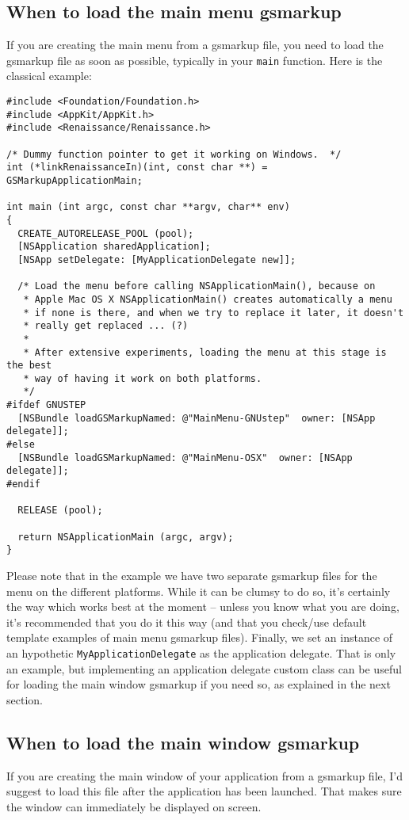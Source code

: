 \subsection{When to load the main menu gsmarkup}\label{integrating-renaissance-menu}
If you are creating the main menu from a gsmarkup file, you need to
load the gsmarkup file as soon as possible, typically in your
\texttt{main} function.  Here is the classical example:
\begin{verbatim}
#include <Foundation/Foundation.h>
#include <AppKit/AppKit.h>
#include <Renaissance/Renaissance.h>

/* Dummy function pointer to get it working on Windows.  */
int (*linkRenaissanceIn)(int, const char **) = GSMarkupApplicationMain;

int main (int argc, const char **argv, char** env)
{
  CREATE_AUTORELEASE_POOL (pool);
  [NSApplication sharedApplication];
  [NSApp setDelegate: [MyApplicationDelegate new]];

  /* Load the menu before calling NSApplicationMain(), because on
   * Apple Mac OS X NSApplicationMain() creates automatically a menu
   * if none is there, and when we try to replace it later, it doesn't
   * really get replaced ... (?)
   *
   * After extensive experiments, loading the menu at this stage is the best
   * way of having it work on both platforms.
   */
#ifdef GNUSTEP
  [NSBundle loadGSMarkupNamed: @"MainMenu-GNUstep"  owner: [NSApp delegate]];
#else
  [NSBundle loadGSMarkupNamed: @"MainMenu-OSX"  owner: [NSApp delegate]];
#endif

  RELEASE (pool);

  return NSApplicationMain (argc, argv);
}
\end{verbatim}
Please note that in the example we have two separate gsmarkup files
for the menu on the different platforms.  While it can be clumsy to do
so, it's certainly the way which works best at the moment -- unless
you know what you are doing, it's recommended that you do it this way
(and that you check/use default template examples of main menu
gsmarkup files).  Finally, we set an instance of an hypothetic
\texttt{MyApplicationDelegate} as the application delegate.  
That is only an example, but implementing an application delegate
custom class can be useful for loading the main window gsmarkup if you
need so, as explained in the next section.

\subsection{When to load the main window gsmarkup}
If you are creating the main window of your application from a
gsmarkup file, I'd suggest to load this file after the application has
been launched.  That makes sure the window can immediately be
displayed on screen.

